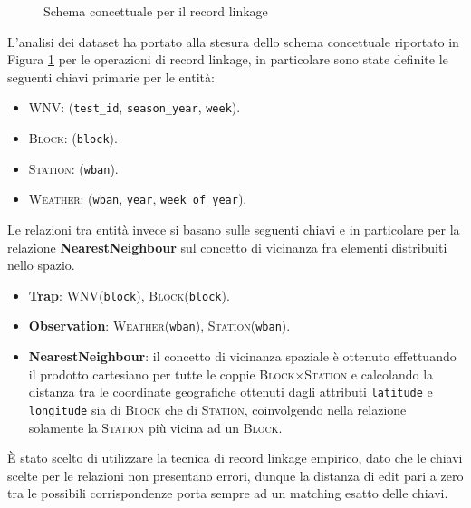 \begin{figure}[h]
    \centering
    \def\svgwidth{\columnwidth}
    \scalebox{.5}{
        
    }
    \label{fig:er-schema}
    \caption{Schema concettuale per il record linkage}
\end{figure}

L'analisi dei dataset ha portato alla stesura dello schema concettuale 
riportato in Figura \ref{fig:er-schema} per le operazioni di record linkage, in 
particolare sono state definite le seguenti chiavi primarie per le entità:

\begin{itemize}
    \item \textsc{WNV}: (\texttt{test\_id}, \texttt{season\_year}, 
    \texttt{week}).

    \item \textsc{Block}: (\texttt{block}).
    
    \item \textsc{Station}: (\texttt{wban}).
    
    \item \textsc{Weather}: (\texttt{wban}, \texttt{year}, 
    \texttt{week\_of\_year}).

\end{itemize}


Le relazioni tra entità invece si basano sulle seguenti chiavi e in particolare 
per la relazione \textbf{NearestNeighbour} sul concetto di vicinanza fra 
elementi distribuiti nello spazio.

\begin{itemize}
    \item \textbf{Trap}: \textsc{WNV}(\texttt{block}), 
    \textsc{Block}(\texttt{block}).

    \item \textbf{Observation}:  \textsc{Weather}(\texttt{wban}), 
    \textsc{Station}(\texttt{wban}).
    
    \item \textbf{NearestNeighbour}: il concetto di vicinanza spaziale è 
    ottenuto effettuando il prodotto cartesiano per tutte le coppie
    \textsc{Block}$\times$\textsc{Station} e calcolando la distanza tra le 
    coordinate geografiche ottenuti dagli attributi \texttt{latitude} e 
    \texttt{longitude} sia di \textsc{Block} che di \textsc{Station},
    coinvolgendo nella relazione solamente la \textsc{Station} più vicina ad 
    un \textsc{Block}.

\end{itemize}

È stato scelto di utilizzare la tecnica di record linkage empirico, dato che 
le chiavi scelte per le relazioni non presentano errori, dunque la distanza di 
edit pari a zero tra le possibili corrispondenze porta sempre ad un matching 
esatto delle chiavi.
